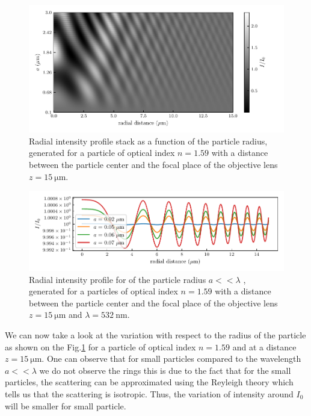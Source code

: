 \begin{figure}
	\centering
	\includegraphics{02_body/chapter2/images/holo_size_exemple/holos_only_r.pdf}
	\caption{Radial intensity profile stack as a function of the particle radius, generated for a particle of optical index $n = 1.59$ with a distance between the particle center and the focal place of the objective lens $z = 15 ~\mathrm{\mu m}$.}
	\label{fig:holo_onlyr}
\end{figure}

\begin{figure}[H]
	\centering
	\includegraphics{02_body/chapter2/images/holo_size_exemple/smallparticles.pdf}
	\caption{Radial intensity profile for of the particle radius $a << \lambda$ , generated for a particles of optical index $n = 1.59$ with a distance between the particle center and the focal place of the objective lens $z = 15 ~\mathrm{\mu m}$ and $\lambda = 532 ~ \mathrm{nm}$.}
	\label{fig:small_part_holo}
\end{figure}


We can now take a look at the variation with respect to the radius of the particle as shown on the Fig.\ref{fig:holo_onlyr} for a particle of optical index $n = 1.59$ and at a distance $z = 15 ~\mathrm{\mu m }$. One can observe that for small particles compared to the wavelength $a << \lambda$ we do not observe the rings this is due to the fact that for the small particles, the scattering can be approximated using the Reyleigh theory which tells us that the scattering is isotropic. Thus, the variation of intensity around $I_0$ will be smaller for small particle.

